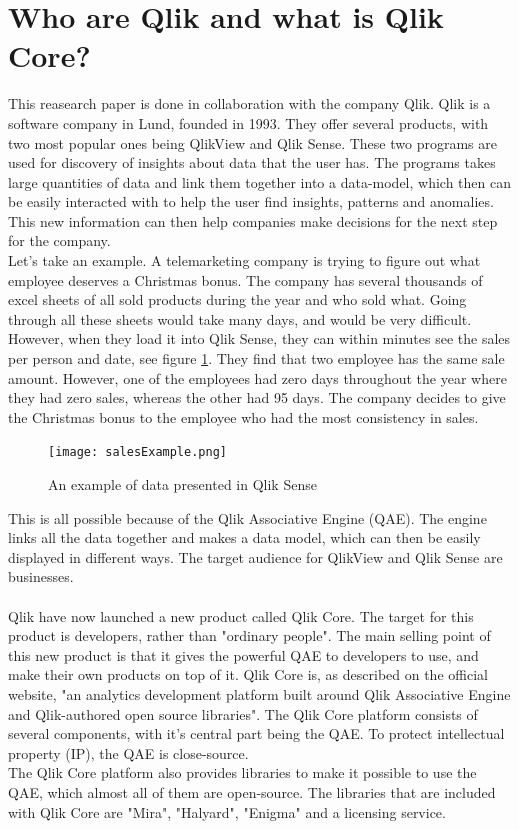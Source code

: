 \documentclass{cslthse-msc}
\begin{document}
    \section{Who are Qlik and what is Qlik Core?}\label{Qlik}
    This reasearch paper is done in collaboration with the company Qlik.
    Qlik is a software company in Lund, founded in 1993\cite{}. They offer several products, with two most popular ones being QlikView and Qlik Sense. These two programs are used for discovery of insights about data that the user has. The programs takes large quantities of data and link them together into a data-model, which then can be easily interacted with to help the user find insights, patterns and anomalies. This new information can then help companies make decisions for the next step for the company.\\ Let's take an example. A telemarketing company is trying to figure out what employee deserves a Christmas bonus. The company has several thousands of excel sheets of all sold products during the year and who sold what. Going through all these sheets would take many days, and would be very difficult. However, when they load it into Qlik Sense, they can within minutes see the sales per person and date, see figure \ref{fig:SenseExample}. They find that two employee has the same sale amount. However, one of the employees had zero days throughout the year where they had zero sales, whereas the other had 95 days. The company decides to give the Christmas bonus to the employee who had the most consistency in sales.
    \begin{figure}[H]
        \centering
        \texttt{[image: salesExample.png]}
        \caption{An example of data presented in Qlik Sense}
        \label{fig:SenseExample}
    \end{figure}
    This is all possible because of the Qlik Associative Engine (QAE). The engine links all the data together and makes a data model, which can then be easily displayed in different ways. The target audience for QlikView and Qlik Sense are businesses.\\ \\
    Qlik have now launched a new product called Qlik Core. The target for this product is developers, rather than "ordinary people". The main selling point of this new product is that it gives the powerful QAE to developers to use, and make their own products on top of it.
    Qlik Core is, as described on the official website, "an analytics development platform built around Qlik Associative Engine and Qlik-authored open source libraries"\citep{qlikwebsite}. The Qlik Core platform consists of several components, with it's central part being the QAE. To protect intellectual property (IP), the QAE is close-source.\\ The Qlik Core platform also provides libraries to make it possible to use the QAE, which almost all of them are open-source. The libraries that are included with Qlik Core are "Mira", "Halyard", "Enigma" and a licensing service.\\
\end{document}
